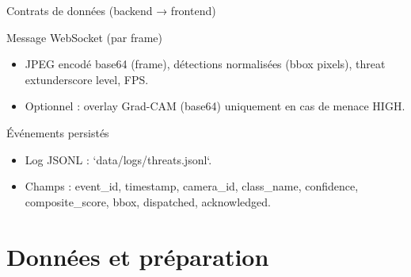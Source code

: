 \documentclass[aspectratio=169,11pt]{beamer}
\begin{document}
\begin{frame}{Contrats de données (backend → frontend)}
  \begin{block}{Message WebSocket (par frame)}
    \begin{itemize}
      \item JPEG encodé base64 (frame), détections normalisées (bbox pixels), threat	extunderscore level, FPS.
      \item Optionnel : overlay Grad-CAM (base64) uniquement en cas de menace HIGH.
    \end{itemize}
  \end{block}

  \begin{block}{Événements persistés}
    \begin{itemize}
      \item Log JSONL : `data/logs/threats.jsonl`.
      \item Champs : event\_id, timestamp, camera\_id, class\_name, confidence, composite\_score, bbox, dispatched, acknowledged.
    \end{itemize}
  \end{block}
\end{frame}

\section{Données et préparation}
\end{document}
